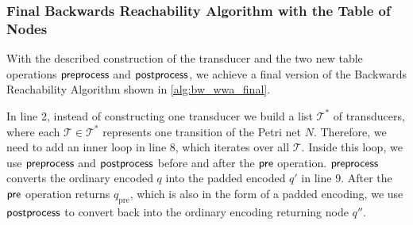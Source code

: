 %
%
%
%
%
%

\subsubsection{Final Backwards Reachability Algorithm with the Table of Nodes}
With the described construction of the transducer and the two new table operations $\operatorname{\textsf{preprocess}}$ and $\operatorname{\textsf{postprocess}}$, we achieve a final version of the Backwards Reachability Algorithm shown in \autoref{alg:bw_wwa_final}. 

In line 2, instead of constructing one transducer we build a list $\mathcal{T}^{*}$ of transducers, where each $\mathcal{T} \in \mathcal{T}^{*}$ represents one transition of the Petri net $N$. Therefore, we need to add an inner loop in line 8, which iterates over all $\mathcal{T}$. Inside this loop, we use $\operatorname{\textsf{preprocess}}$ and $\operatorname{\textsf{postprocess}}$ before and after the $\operatorname{\textsf{pre}}$ operation. $\operatorname{\textsf{preprocess}}$ converts the ordinary encoded $q$ into the padded encoded $q'$ in line 9. After the $\operatorname{\textsf{pre}}$ operation returns $q_{\text{pre}}$, which is also in the form of a padded encoding, we use $\operatorname{\textsf{postprocess}}$ to convert back into the ordinary encoding returning node $q''$.

